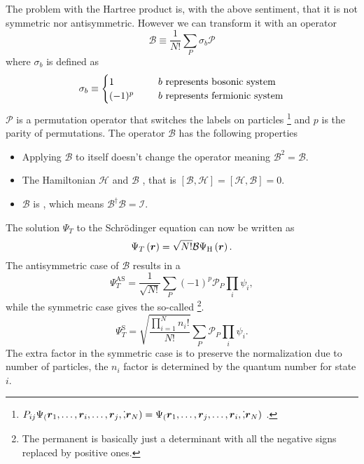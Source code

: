     The problem with the Hartree product is, with the above sentiment, that it
    is not symmetric nor antisymmetric. However we can transform it with an
    operator
        \begin{equation}
            \mathcal{B} \equiv \frac{1}{N!}\sum_P\sigma_b\mathcal{P}
        \end{equation}
    where $\sigma_b$ is defined as 
        \begin{equation}
            \sigma_b \equiv  
                \begin{cases}
                    1 \indent &\text{$b$ represents bosonic system} \\
                    (-1)^p \indent &\text{$b$ represents fermionic system}
                \end{cases}
        \end{equation}
    $\mathcal{P}$ is a permutation operator that switches the labels on particles
    \footnote{$P_{ij}\Psi_(\boldsymbol{{r}}_1,\dots,\boldsymbol{{r}}_i,\dots,\boldsymbol{{r}}_j,\dot,\boldsymbol{{r}}_N)
    = \Psi_(\boldsymbol{{r}}_1,\dots,\boldsymbol{{r}}_j,\dots,\boldsymbol{{r}}_i,\dot,\boldsymbol{{r}}_N)$
    \cite{compphysThijssen}.} and $p$ is the parity of permutations. The
    operator $\mathcal{B}$ has the following properties
        \begin{itemize}
            \item Applying $\mathcal{B}$ to itself doesn't change the operator
                meaning $\mathcal{B}^2 = \mathcal{B}$.
            \item The Hamiltonian $\mathcal{H}$ and $\mathcal{B}$
                , that is $\left[\mathcal{B},\mathcal{H}\right]
                = \left[\mathcal{H},\mathcal{B}\right] = 0$.
            \item $\mathcal{B}$ is , which means
                $\mathcal{B}^{\dagger}\mathcal{B}=\mathcal{I}$.
        \end{itemize}
    The solution $\Psi_T$ to the Schrödinger equation can now be written as
        \begin{equation}
            \Psi_T\left(\boldsymbol{{r}}\right) =
            \sqrt{N!}\mathcal{B}\Psi_{\text{H}}\left(\boldsymbol{{r}}\right).
            \label{eq:psiOpB}
        \end{equation}
    The antisymmetric case of $\mathcal{B}$ results in a  
        \begin{equation}
            \Psi^{\text{AS}}_T =
            \frac{1}{\sqrt{N!}}\sum_{P}(-1)^p\mathcal{P}_P\prod_i\psi_i,
        \end{equation}
    while the symmetric case gives the so-called \footnote{The
    permanent is basically just a determinant with all the negative signs
    replaced by positive ones.}.
        \begin{equation}
            \Psi^{\text{S}}_T =
            \sqrt{\frac{\prod\limits^N_{i=1}n_i!}{N!}}\sum_{P}\mathcal{P}_P\prod_i\psi_i.
        \end{equation}
   The extra factor in the symmetric case is to preserve the normalization due
   to number of particles, the $n_i$ factor is determined by the quantum number
   for state $i$.

